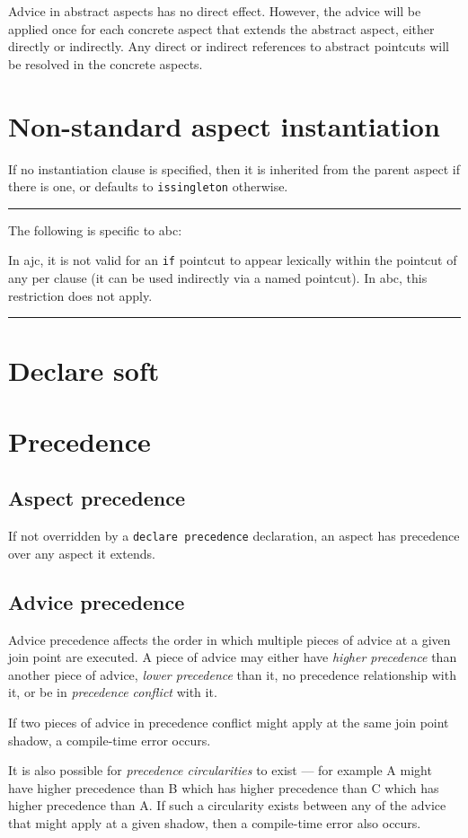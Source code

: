\documentclass[12pt,a4paper]{report}
\newcommand\abcdistinctionbegin[0]{%
\hrule
\noindent
The following is specific to abc:

\noindent
}
\newcommand\abcdistinctionend[0]{%
\hrule
}
\begin{document}
Advice in abstract aspects has no direct effect. However, the advice
will be applied once for each concrete aspect that extends the abstract 
aspect, either directly or indirectly. Any direct or indirect 
references to abstract pointcuts will be resolved in the concrete aspects.

\chapter{Non-standard aspect instantiation}

If no instantiation clause is specified, then it is inherited from the parent
aspect if there is one, or defaults to \verb|issingleton| otherwise.

\abcdistinctionbegin
In ajc, it is not valid for an \verb|if| pointcut to appear lexically
within the pointcut of any per clause (it can be used indirectly via a 
named pointcut). In abc, this restriction does not apply.
\abcdistinctionend

\chapter{Declare soft}

\chapter{Precedence}
\section{Aspect precedence}
If not overridden by a \verb|declare precedence| declaration, an aspect 
has precedence over any aspect it extends.

\section{Advice precedence}
Advice precedence affects the order in which multiple pieces of advice
at a given join point are executed. A piece of advice may either have 
{\em higher precedence} than another piece of advice, 
{\em lower precedence} than it, 
no precedence relationship with it, 
or be in {\em precedence conflict} with it.

If two pieces of advice in precedence conflict might apply at the same
join point shadow, a compile-time error occurs.

It is also possible for {\em precedence circularities} to exist --- for example
A might have higher precedence than B which has higher precedence than C
which has higher precedence than A. If such a circularity exists between
any of the advice that might apply at a given shadow, then a compile-time
error also occurs.
\end{document}
